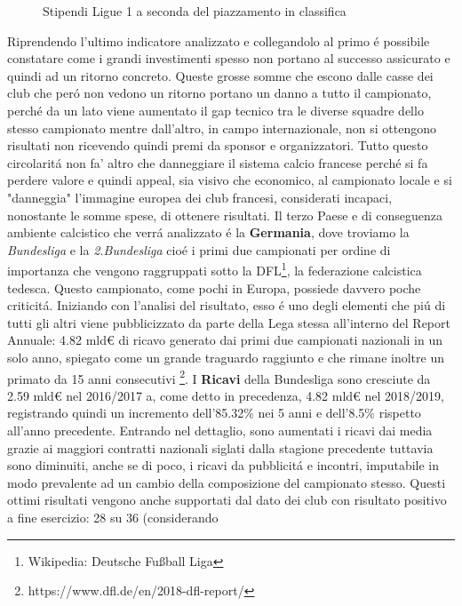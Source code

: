 \documentclass[
    corpo=12pt,
    oneside,
    evenboxes,
    tipotesi=triennale,
    stile=classica,
    oldstyle,
    autoretitolo,
    greek,
]{toptesi}
\begin{document}
\begin{interlinea}{1.5}
\begin{figure}
    \caption{Stipendi Ligue 1 a seconda del piazzamento in classifica}
    \label{stipendi_ligue1}
\end{figure}
Riprendendo l'ultimo indicatore analizzato e collegandolo al primo \'e possibile constatare come i grandi investimenti spesso non portano 
al successo assicurato e quindi ad un ritorno concreto. Queste grosse somme che escono dalle casse dei club che per\'o
non vedono un ritorno portano un danno a tutto il campionato, perch\'e da un lato viene aumentato il gap tecnico tra le diverse squadre dello
stesso campionato mentre dall'altro, in campo internazionale, non si ottengono risultati non ricevendo quindi premi da sponsor e organizzatori.
Tutto questo circolarit\'a non fa' altro che danneggiare il sistema calcio francese perch\'e si fa perdere valore e quindi appeal, sia 
visivo che economico, al campionato locale e si "danneggia" l'immagine europea dei club francesi, considerati incapaci, nonostante le somme spese,
di ottenere risultati.\newline
Il terzo Paese e di conseguenza ambiente calcistico che verr\'a analizzato \'e la \textbf{Germania}, dove troviamo la \emph{Bundesliga} e la \emph{2.Bundesliga} 
cio\'e i primi due campionati per ordine di importanza che vengono raggruppati sotto la DFL\footnote{Wikipedia: Deutsche Fußball Liga}, la
federazione calcistica tedesca.\newline
Questo campionato, come pochi in Europa, possiede davvero poche criticit\'a. Iniziando con l'analisi del risultato, 
esso \'e uno degli elementi che pi\'u di tutti gli altri viene pubblicizzato 
da parte della Lega stessa all'interno del Report Annuale: 4.82 mld€ di ricavo generato dai primi due campionati nazionali in un 
solo anno, spiegato come un grande traguardo raggiunto e che rimane inoltre un primato da 15 anni consecutivi
\footnote{https://www.dfl.de/en/2018-dfl-report/}.\newline
I \textbf{Ricavi} della Bundesliga sono cresciute da 2.59 mld€ nel 2016/2017 a, come detto in precedenza, 4.82 mld€ nel 2018/2019, 
registrando quindi un incremento dell'85.32\% nei 5 anni e dell'8.5\% rispetto
all'anno precedente. Entrando nel dettaglio, sono aumentati i ricavi dai media grazie ai maggiori contratti nazionali siglati dalla stagione precedente tuttavia sono diminuiti, anche se di poco,
i ricavi da pubblicit\'a e incontri, imputabile in modo prevalente ad un cambio della composizione del campionato stesso.
Questi ottimi risultati vengono anche supportati dal dato dei club con risultato positivo a fine esercizio: 28 su 36 (considerando 

\end{interlinea}
\end{document}
